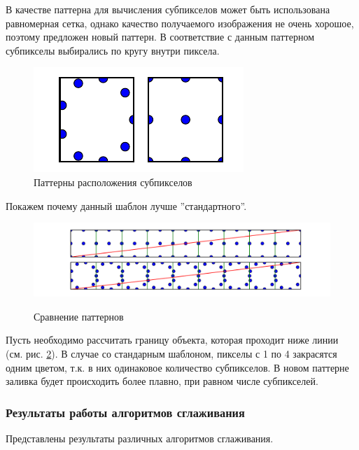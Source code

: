 \documentclass[12pt, a4paper, utf8]{article}
\begin{document}
В качестве паттерна для вычисления субпикселов может быть использована равномерная сетка, однако качество получаемого изображения не очень хорошое, поэтому предложен новый паттерн. В соответствие с данным паттерном субпикселы выбирались по кругу внутри пиксела. 

\begin{figure}[H]
\centering
\includegraphics[scale=1]{imgs/aa_pattern.pdf}
\caption{Паттерны расположения субпикселов}\label{fig:pattern_subpixel}
\end{figure}

\noindent
Покажем почему данный шаблон лучше ''стандартного''.

\begin{figure}[H]
\centering
{\hspace*{-2.35cm}\includegraphics[scale=1]{imgs/aa_example.pdf}}
\caption{Сравнение паттернов}\label{fig:compare_pattern_subpixel}
\end{figure}

Пусть необходимо рассчитать границу объекта, которая проходит ниже линии (см. рис. \ref{fig:compare_pattern_subpixel}). В случае со стандарным шаблоном, пикселы с 1 по 4 закрасятся одним цветом, т.к. в них одинаковое количество субпикселов. В новом паттерне заливка будет происходить более плавно, при равном числе субпикселей.

\subsubsection{Результаты работы алгоритмов сглаживания}
Представлены результаты различных алгоритмов сглаживания.
\end{document}
